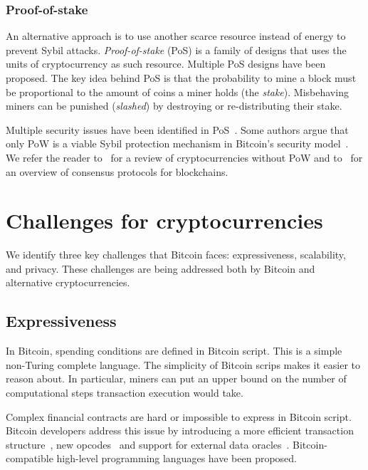 \subsubsection*{Proof-of-stake}

An alternative approach is to use another scarce resource instead of energy to prevent Sybil attacks.
\textit{Proof-of-stake} (PoS) is a family of designs that uses the units of cryptocurrency as such resource.
Multiple PoS designs have been proposed.
The key idea behind PoS is that the probability to mine a block must be proportional to the amount of coins a miner holds (the \textit{stake}).
Misbehaving miners can be punished (\textit{slashed}) by destroying or re-distributing their stake.

Multiple security issues have been identified in PoS~\cite{Fanti2019,Gazi2018,BrownCohen2019,Chitra2020}.
Some authors argue that only PoW is a viable Sybil protection mechanism in Bitcoin's security model~\cite{Andreev2014, Sztorc2015, Poelstra2015}.
We refer the reader to~\cite{Bentov2016} for a review of cryptocurrencies without PoW and to~\cite{Bano2019} for an overview of consensus protocols for blockchains.



\section{Challenges for cryptocurrencies}

We identify three key challenges that Bitcoin faces: expressiveness, scalability, and privacy.
These challenges are being addressed both by Bitcoin and alternative cryptocurrencies.


\subsection{Expressiveness}

In Bitcoin, spending conditions are defined in Bitcoin script.
This is a simple non-Turing complete language.
The simplicity of Bitcoin scrips makes it easier to reason about.
In particular, miners can put an upper bound on the number of computational steps transaction execution would take.

Complex financial contracts are hard or impossible to express in Bitcoin script.
Bitcoin developers address this issue by introducing a more efficient transaction structure~\cite{Wuille2020}, new opcodes~\cite{Rubin2020} and support for external data oracles~\cite{Dryja}.
Bitcoin-compatible high-level programming languages have been proposed.

